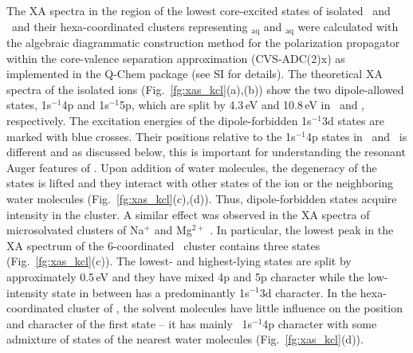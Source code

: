 {\color{blue} The XA spectra in the region of the lowest core-excited states of isolated \ki~and \cli~and their hexa-coordinated clusters representing \ki$_{\text{aq}}$ and \cli$_{\text{aq}}$ were calculated with the algebraic diagrammatic construction method for the polarization propagator \citep{sch82:2395} within the core-valence separation approximation \citep{bar85:867,ced80:206,ced81:1038} (CVS-ADC(2)x) as implemented in the Q-Chem package \citep{Wenzel14:1900,Wenzel14:4583,Wormit14:774,QChem2015} (see SI for details).}
The theoretical XA spectra of the isolated ions (Fig.\ \ref{fg:xas_kcl}(a),(b)) show the two dipole-allowed states, 1s$^{-1}$4p and 1s$^{-1}$5p, which are split by 4.3\,eV and 10.8\,eV in \ki~and \cli, respectively. {\color{blue}The excitation energies of the dipole-forbidden 1s$^{-1}$3d states are marked with blue crosses. Their positions relative to the 1s$^{-1}$4p states in \ki~and \cli~is different and as discussed below, this is important} for understanding the resonant Auger features of \ki. Upon addition of water molecules, the degeneracy of the states is lifted and they interact with other states of the ion or the neighboring water molecules (Fig.\ \ref{fg:xas_kcl}(c),(d)). Thus, dipole-forbidden states acquire intensity in the cluster. A similar effect was observed in the XA spectra of microsolvated clusters of Na$^{+}$ and Mg$^{2+}$ \citep{miteva16:16671}.
%
%
{\color{blue} In particular, the lowest peak in the XA spectrum of the} 6-coordinated \ki~cluster contains three states (Fig.\ \ref{fg:xas_kcl}(c)). The lowest- and highest-lying states are split by approximately 0.5\,eV and they have mixed 4p and 5p character while the low-intensity state in between has a predominantly 1s$^{-1}$3d character. In the hexa-coordinated cluster of \cli, the solvent molecules have little influence on the position and character of the first state -- it has mainly \cli~1s$^{-1}$4p character with some admixture of states of the nearest water molecules (Fig.\ \ref{fg:xas_kcl}(d)).


